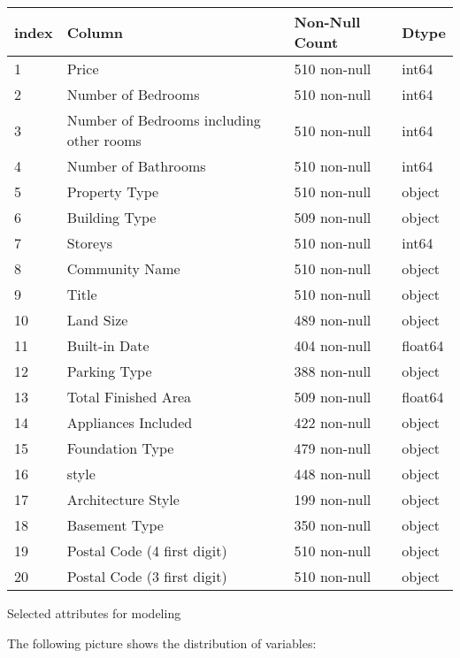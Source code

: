 \documentclass{article}
\begin{document}
\begin{center}
    \begin{tabular}{ | m{2em} | m{5cm}| m{2.5cm} | m{2cm} |} 
        \hline
        index &  Column    &          Non-Null Count & Dtype   \\ 
        \hline
        1 &  Price   &            510 non-null &   int64  \\ 
        2  & Number of Bedrooms     &       510 non-null  &  int64   \\ 
        3  & Number of Bedrooms including other rooms &      510 non-null &   int64  \\
        4  & Number of Bathrooms      &     510 non-null  &  int64  \\
        5  & Property Type    &    510 non-null   & object \\
        6  & Building Type     &   509 non-null &   object \\
        7  & Storeys           &  510 non-null  &  int64  \\
        8  & Community Name &      510 non-null   & object \\
        9  & Title          &     510 non-null &   object \\
        10  & Land Size        &    489 non-null  &  object \\
        11 & Built-in Date         &   404 non-null   & float64\\
        12 & Parking Type       &  388 non-null &   object \\
        13 & Total Finished Area  & 509 non-null  &  float64\\
        14 & Appliances Included & 422 non-null   & object \\
        15 & Foundation Type    &  479 non-null &   object \\
        16 & style         &      448 non-null  &  object \\
        17 & Architecture Style &  199 non-null   & object \\
        18 & Basement Type      &  350 non-null &   object \\
        19 & Postal Code (4 first digit) &  510 non-null  &  object \\
        20 & Postal Code (3 first digit) &  510 non-null   & object \\
         \hline
    \end{tabular}
    \caption{Selected attributes for modeling}
\end{center}
The following picture shows the distribution of variables: \\
\end{document}
